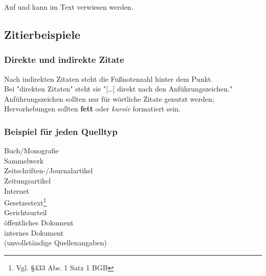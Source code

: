 
Auf  und  kann im Text verwiesen werden.%

\subsection{Zitierbeispiele}

\subsubsection{Direkte und indirekte Zitate}

Nach indirekten Zitaten steht die Fußnotenzahl hinter dem Punkt.\\%
Bei "direkten Zitaten" steht sie "[\ldots] direkt nach den Anführungszeichen."\\%
Anführungszeichen sollten nur für wörtliche Zitate genutzt werden; Hervorhebungen sollten \textbf{fett} oder \textit{kursiv} formatiert sein.

\newpage
\subsubsection{Beispiel für jeden Quelltyp}

Buch/Monografie\\
Sammelwerk\\
Zeitschriften-/Journalartikel\\
Zeitungsartikel\\
Internet\\
Gesetzestext\footnote{Vgl. §433 Abs. 1 Satz 1 BGB}\nocite{bgb}\\
Gerichtsurteil\\
öffentliches Dokument\\
internes Dokument\\%
(unvollständige Quellenangaben)

